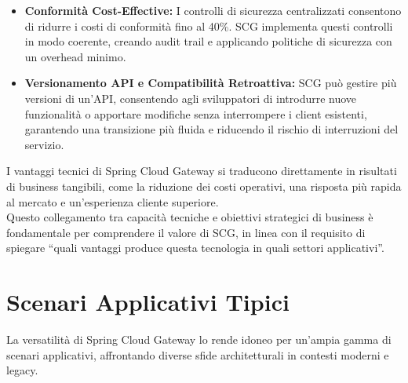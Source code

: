 \begin{itemize}
    \item \textbf{Conformità Cost-Effective:} I controlli di sicurezza centralizzati consentono di ridurre i costi di conformità fino al 40\%. SCG implementa questi controlli in modo coerente, creando audit trail e applicando politiche di sicurezza con un overhead minimo.
    \item \textbf{Versionamento API e Compatibilità Retroattiva:} SCG può gestire più versioni di un'API, consentendo agli sviluppatori di introdurre nuove funzionalità o apportare modifiche senza interrompere i client esistenti, garantendo una transizione più fluida e riducendo il rischio di interruzioni del servizio.
\end{itemize}

I vantaggi tecnici di Spring Cloud Gateway si traducono direttamente in risultati di business tangibili, come la riduzione dei costi operativi, una risposta più rapida al mercato e un'esperienza cliente superiore. \\
Questo collegamento tra capacità tecniche e obiettivi strategici di business è fondamentale per comprendere il valore di SCG, in linea con il requisito di spiegare \enquote{quali vantaggi produce questa tecnologia in quali settori applicativi}.

\section{Scenari Applicativi Tipici}

La versatilità di Spring Cloud Gateway lo rende idoneo per un'ampia gamma di scenari applicativi, affrontando diverse sfide architetturali in contesti moderni e legacy.

